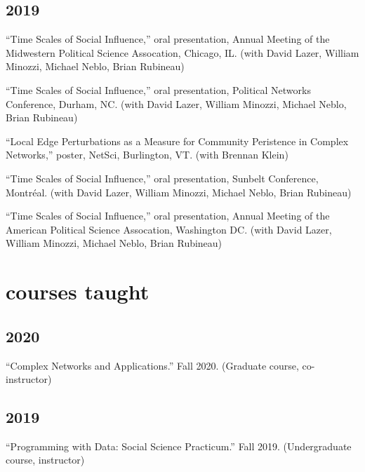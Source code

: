 \documentclass[11pt, letter]{article}
\begin{document}
\subsection{2019}
\begin{hangparas}{.25in}{1}
``Time Scales of Social Influence,'' oral presentation, Annual Meeting of the
Midwestern Political Science Assocation, Chicago, IL. (with David Lazer,
William Minozzi, Michael Neblo, Brian Rubineau) \vspace{2mm}

``Time Scales of Social Influence,'' oral presentation, Political Networks
Conference, Durham, NC. (with David Lazer, William Minozzi, Michael Neblo, Brian
Rubineau) \vspace{2mm}

``Local Edge Perturbations as a Measure for Community Peristence in Complex
Networks,'' poster, NetSci, Burlington, VT. (with Brennan Klein) \vspace{2mm}

``Time Scales of Social Influence,'' oral presentation, Sunbelt Conference,
Montréal. (with David Lazer, William Minozzi, Michael Neblo, Brian
Rubineau) \vspace{2mm}

``Time Scales of Social Influence,'' oral presentation, Annual Meeting of the
American Political Science Assocation, Washington DC. (with David Lazer, William
Minozzi, Michael Neblo, Brian Rubineau) \vspace{2mm}
\end{hangparas}

\vspace{2mm}
\section{courses taught}
\subsection{2020}
\begin{hangparas}{.25in}{1}
``Complex Networks and Applications.'' Fall 2020. (Graduate course,
co-instructor)
\end{hangparas}
\vspace{1mm}

\subsection{2019}
\begin{hangparas}{.25in}{1}
``Programming with Data: Social Science Practicum.'' Fall 2019.
(Undergraduate course, instructor) \vspace{2mm}
\end{hangparas}
\end{document}
